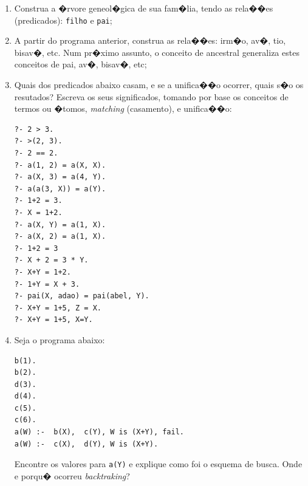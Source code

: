 \documentclass[final,a4paper]{article}
\begin{document}
\begin{enumerate}
\item  Construa a �rvore geneol�gica de sua fam�lia, tendo as rela��es
(predicados): \texttt{filho} e \texttt{pai};

\item  A partir do programa anterior, construa as rela��es: irm�o, av�, tio, bisav�,
etc. Num pr�ximo assunto, o conceito de  ancestral generaliza estes
 conceitos de pai, av�, bisav�, etc;

\item  Quais dos predicados abaixo casam, e se a unifica��o ocorrer, quais 
s�o os resutados? Escreva os seus significados, tomando por base os conceitos
de termos ou �tomos, {\em matching} (casamento), e unifica��o:


\begin{lstlisting}
?- 2 > 3.
?- >(2, 3).
?- 2 == 2.
?- a(1, 2) = a(X, X).
?- a(X, 3) = a(4, Y).
?- a(a(3, X)) = a(Y). 
?- 1+2 = 3.
?- X = 1+2.
?- a(X, Y) = a(1, X).
?- a(X, 2) = a(1, X).
?- 1+2 = 3
?- X + 2 = 3 * Y.
?- X+Y = 1+2.
?- 1+Y = X + 3.
?- pai(X, adao) = pai(abel, Y).
?- X+Y = 1+5, Z = X.
?- X+Y = 1+5, X=Y.
\end{lstlisting}

\item  Seja o programa abaixo:
\begin{verbatim}
b(1).       
b(2).
d(3).
d(4).    
c(5).    
c(6).     
a(W) :-  b(X),  c(Y), W is (X+Y), fail.
a(W) :-  c(X),  d(Y), W is (X+Y).
\end{verbatim}
Encontre os valores para \texttt{a(Y)} e explique como foi o esquema de
busca. Onde e porqu� ocorreu \textit{backtraking}?
\end{enumerate}
\end{document}
